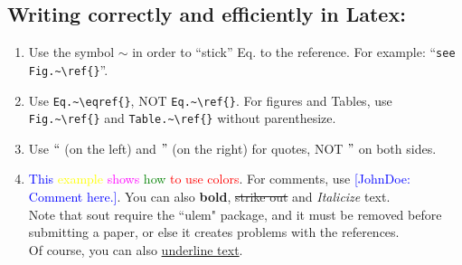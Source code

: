 \documentclass[pre,aps,reprint,noshowpacs,superscriptaddress,floatfix,letterpaper,longbibliography]{revtex4-2}
\newcommand{\Comment}[1]{\textcolor{blue}{[JohnDoe: #1]}}
\newcommand{\red}{\textcolor{red}}
\newcommand{\green}{\textcolor{green}}
\newcommand{\blue}{\textcolor{blue}}
\newcommand{\yellow}{\textcolor{yellow}}
\newcommand{\magenta}{\textcolor{magenta}}
\begin{document}
\subsection{Writing correctly and efficiently in Latex:}
\begin{enumerate} 
\item Use the symbol $\sim$ in order to ``stick'' Eq. to the reference. For example: ``\verb|see Fig.~\ref{}|''. 

\item Use \verb|Eq.~\eqref{}|, NOT \verb|Eq.~\ref{}|. For figures and Tables, use \verb|Fig.~\ref{}| and \verb|Table.~\ref{}| without parenthesize. 

    \item Use $``$ (on the left) and $"$ (on the right) for quotes, NOT $"$ on both sides. 
    
\item \blue{This} \yellow{example} \magenta{shows} \green{how} \red{to use colors}. For comments, use \Comment{Comment here.}. You can also \textbf{bold}, \sout{strike out} and \textit{Italicize} text. \\ Note that sout require the ``ulem" package, and it must be removed before submitting a paper, or else it creates problems with the references.\\ Of course, you can also \underline{underline text}. 


\end{enumerate}
\end{document}

